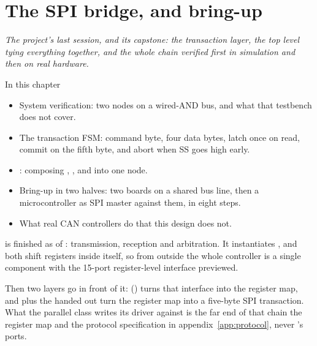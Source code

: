 
\chapter{The SPI bridge,  and bring-up}
\label{c19:ch}

{\large\itshape The project's last session, and its capstone: the transaction layer, the top level
tying everything together, and the whole chain verified first in simulation and then on real
hardware.\par}

\begin{chapterbox}{In this chapter}
\begin{itemize}
  \item System verification: two nodes on a wired-AND bus, and what that testbench does not cover.
  \item The transaction FSM: command byte, four data bytes, latch once on read, commit on the fifth
    byte, and abort when SS goes high early.
  \item {}: composing , ,
     and  into one node.
  \item Bring-up in two halves: two boards on a shared bus line, then a microcontroller as SPI master
    against them, in eight steps.
  \item What real CAN controllers do that this design does not.
\end{itemize}
\end{chapterbox}

 is finished as of : transmission, reception and arbitration. It
instantiates ,  and both shift registers inside itself, so from outside
the whole controller is a single component with the 15-port register-level interface
 previewed.

Then two layers go in front of it:  () turns that interface into
the register map, and  plus the  handed out turn the register map
into a five-byte SPI transaction. What the parallel class writes its driver against is the far end of
that chain \textemdash{} the register map and the protocol specification in
appendix~\ref{app:protocol}, never 's ports.


